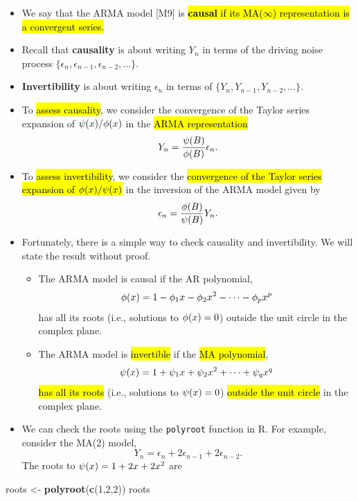 \documentclass[]{article}
\newenvironment{Shaded}{\begin{snugshade}}{\end{snugshade}}
\newcommand{\KeywordTok}[1]{\textcolor[rgb]{0.13,0.29,0.53}{\textbf{#1}}}
\newcommand{\DecValTok}[1]{\textcolor[rgb]{0.00,0.00,0.81}{#1}}
\newcommand{\StringTok}[1]{\textcolor[rgb]{0.31,0.60,0.02}{#1}}
\newcommand{\NormalTok}[1]{#1}
\begin{document}
\begin{itemize}
\item
  We say that the ARMA model {[}M9{]} is \hl{\textbf{causal} if its
  MA($\infty$) representation is a convergent series.}
\item
  Recall that \textbf{causality} is about writing \(Y_n\) in terms of
  the driving noise process
  \(\{\epsilon_n,\epsilon_{n-1},\epsilon_{n-2},\dots\}\).
\item
  \textbf{Invertibility} is about writing \(\epsilon_n\) in terms of
  \(\{Y_n, Y_{n-1}, Y_{n-2},\dots\}\).
\item
  To \hl{assess causality}, we consider the convergence of the Taylor series
  expansion of \(\psi(x)/\phi(x)\) in the \hl{ARMA representation}
  \[ Y_n = \frac{\psi(B)}{\phi(B)} \epsilon_n.\]
\item
  To \hl{assess invertibility}, we consider the \hl{convergence of the Taylor
  series expansion of $\phi(x)/\psi(x)$} in the inversion of the ARMA
  model given by \[ \epsilon_n = \frac{\phi(B)}{\psi(B)} Y_n.\]
\item
  Fortunately, there is a simple way to check causality and
  invertibility. We will state the result without proof.

  \begin{itemize}
  \item
    The ARMA model is causal if the AR polynomial,
    \[ \phi(x) = 1-\phi_1 x - \phi_2 x^2 - \dots - \phi_p x^p\] has all its
    roots (i.e., solutions to \(\phi(x)=0\)) outside the unit circle in
    the complex plane.
  \item
    The ARMA model is \hl{invertible} if the \hl{MA polynomial},
    \[ \psi(x) = 1+\psi_1 x + \psi_2 x^2 + \dots + \psi_q x^q\] \hl{has all its
    roots} (i.e., solutions to \(\psi(x)=0\)) \hl{outside the unit circle} in
    the complex plane.
  \end{itemize}
\item
  We can check the roots using the \texttt{polyroot} function in R. For
  example, consider the MA(2) model,
  \[ Y_n = \epsilon_n + 2\epsilon_{n-1} + 2\epsilon_{n-2}.\] The roots
  to \(\psi(x)= 1+2x+2x^2\) are
\end{itemize}

\begin{Shaded}
\begin{Highlighting}[]
\NormalTok{roots <-}\StringTok{ }\KeywordTok{polyroot}\NormalTok{(}\KeywordTok{c}\NormalTok{(}\DecValTok{1}\NormalTok{,}\DecValTok{2}\NormalTok{,}\DecValTok{2}\NormalTok{))}
\NormalTok{roots}
\end{Highlighting}
\end{Shaded}
\end{document}
